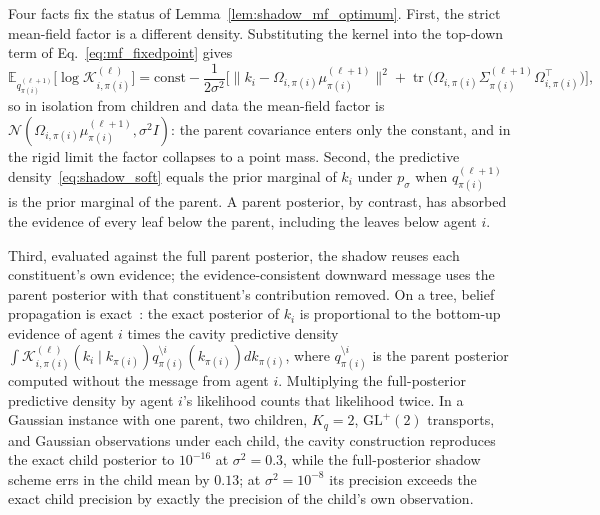 \begin{remark}
\label{rem:shadow_marginal_vs_mf}
Four facts fix the status of Lemma~\ref{lem:shadow_mf_optimum}. First, the strict mean-field factor is a different density. Substituting the kernel into the top-down term of Eq.~\eqref{eq:mf_fixedpoint} gives
\[
\mathbb{E}_{q_{\pi(i)}^{(\ell+1)}}\big[\log \mathcal{K}_{i,\pi(i)}^{(\ell)}\big] = \text{const} - \frac{1}{2\sigma^2}\Big[\big\|k_i - \Omega_{i,\pi(i)}\mu_{\pi(i)}^{(\ell+1)}\big\|^2 + \operatorname{tr}\big(\Omega_{i,\pi(i)}\Sigma_{\pi(i)}^{(\ell+1)}\Omega_{i,\pi(i)}^\top\big)\Big],
\]
so in isolation from children and data the mean-field factor is $\mathcal{N}(\Omega_{i,\pi(i)}\mu_{\pi(i)}^{(\ell+1)}, \sigma^2 I)$: the parent covariance enters only the constant, and in the rigid limit the factor collapses to a point mass. Second, the predictive density~\eqref{eq:shadow_soft} equals the prior marginal of $k_i$ under $p_\sigma$ when $q_{\pi(i)}^{(\ell+1)}$ is the prior marginal of the parent. A parent posterior, by contrast, has absorbed the evidence of every leaf below the parent, including the leaves below agent $i$.

Third, evaluated against the full parent posterior, the shadow reuses each constituent's own evidence; the evidence-consistent downward message uses the parent posterior with that constituent's contribution removed. On a tree, belief propagation is exact~\cite[\S8.4]{Bishop2006}: the exact posterior of $k_i$ is proportional to the bottom-up evidence of agent $i$ times the cavity predictive density $\int \mathcal{K}_{i,\pi(i)}^{(\ell)}(k_i \mid k_{\pi(i)}) q_{\pi(i)}^{\setminus i}(k_{\pi(i)}) dk_{\pi(i)}$, where $q_{\pi(i)}^{\setminus i}$ is the parent posterior computed without the message from agent $i$. Multiplying the full-posterior predictive density by agent $i$'s likelihood counts that likelihood twice. In a Gaussian instance with one parent, two children, $K_q = 2$, $\mathrm{GL}^+(2)$ transports, and Gaussian observations under each child, the cavity construction reproduces the exact child posterior to $10^{-16}$ at $\sigma^2 = 0.3$, while the full-posterior shadow scheme errs in the child mean by $0.13$; at $\sigma^2 = 10^{-8}$ its precision exceeds the exact child precision by exactly the precision of the child's own observation.


\end{remark}
